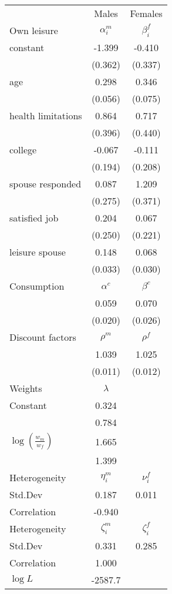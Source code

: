 \begin{tabular}{lcc} 
\hline\hline 
 & Males & Females \\ 
Own leisure & $\alpha_{i}^{m}$ & $\beta_{i}^{f}$ \\ 
constant & -1.399 & -0.410 \\ 
 & (0.362) & (0.337) \\ 
age & 0.298 & 0.346 \\ 
 & (0.056) & (0.075) \\ 
health limitations & 0.864 & 0.717 \\ 
 & (0.396) & (0.440) \\ 
college & -0.067 & -0.111 \\ 
 & (0.194) & (0.208) \\ 
spouse responded & 0.087 & 1.209 \\ 
 & (0.275) & (0.371) \\ 
satisfied job & 0.204 & 0.067 \\ 
 & (0.250) & (0.221) \\ 
leisure spouse & 0.148 & 0.068 \\ 
 & (0.033) & (0.030) \\ 
Consumption & $\alpha^{c}$ & $\beta^{c}$ \\ 
 & 0.059 & 0.070 \\ 
 & (0.020) & (0.026) \\ 
Discount factors & $\rho^m$ & $\rho^f$ \\ 
 & 1.039 & 1.025 \\ 
 & (0.011) & (0.012) \\ 
Weights & $\lambda$ &  \\ 
Constant & 0.324 &  \\ 
 & 0.784 &  \\ 
$\log(\frac{w_m}{w_f})$ & 1.665 &  \\ 
 & 1.399 &  \\ 
Heterogeneity & $\eta_i^m$ & $\nu_i^f$ \\ 
Std.Dev & 0.187 & 0.011 \\ 
Correlation & -0.940 &  \\ 
Heterogeneity & $\zeta_i^m$ & $\zeta_i^f$ \\ 
Std.Dev & 0.331 & 0.285 \\ 
Correlation & 1.000 &  \\ 
\hline 
$\log L$ & -2587.7 & \\ 
\hline \hline 
\end{tabular} 
